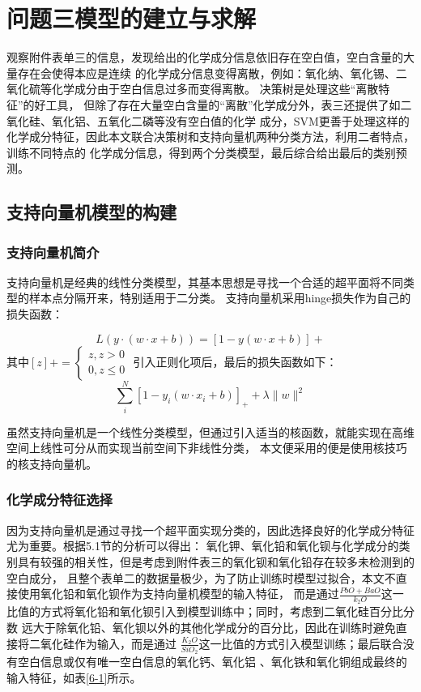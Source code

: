 \documentclass[withoutpreface,bwprint]{cumcmthesis} %
\begin{document}
\section{问题三模型的建立与求解}

观察附件表单三的信息，发现给出的化学成分信息依旧存在空白值，空白含量的大量存在会使得本应是连续 的化学成分信息变得离散，例如：氧化纳、氧化锡、二氧化硫等化学成分由于空白信息过多而变得离散。 决策树是处理这些“离散特征”的好工具， 但除了存在大量空白含量的“离散”化学成分外，表三还提供了如二氧化硅、氧化铝、五氧化二磷等没有空白值的化学 成分，SVM更善于处理这样的化学成分特征，因此本文联合决策树和支持向量机两种分类方法，利用二者特点，训练不同特点的 化学成分信息，得到两个分类模型，最后综合给出最后的类别预测。

\subsection{支持向量机模型的构建}

\subsubsection{支持向量机简介}

支持向量机是经典的线性分类模型，其基本思想是寻找一个合适的超平面将不同类型的样本点分隔开来，特别适用于二分类。 支持向量机采用hinge损失作为自己的损失函数： 

$$L(y \cdot(w \cdot x+b))=[1-y(w \cdot x+b)]{+}$$ 其中$[z]{+}=\left\{\begin{array}{l} z, z>0 \\ 0, z \leq 0 \end{array}\right.$
引入正则化项后，最后的损失函数如下： $$\sum_{i}^{N}\left[1-y_{i}\left(w \cdot x_{i}+b\right)\right]_{+}+\lambda\|w\|^{2}$$

虽然支持向量机是一个线性分类模型，但通过引入适当的核函数，就能实现在高维空间上线性可分从而实现当前空间下非线性分类， 本文便采用的便是使用核技巧的核支持向量机。

\subsubsection{化学成分特征选择}

因为支持向量机是通过寻找一个超平面实现分类的，因此选择良好的化学成分特征尤为重要。根据5.1节的分析可以得出： 氧化钾、氧化铅和氧化钡与化学成分的类别具有较强的相关性，但是考虑到附件表三的氧化钡和氧化铅存在较多未检测到的空白成分， 且整个表单二的数据量极少，为了防止训练时模型过拟合，本文不直接使用氧化铅和氧化钡作为支持向量机模型的输入特征， 而是通过$\frac{PbO+BaO}{k_{2} O}$这一比值的方式将氧化铅和氧化钡引入到模型训练中；同时，考虑到二氧化硅百分比分数 远大于除氧化铅、氧化钡以外的其他化学成分的百分比，因此在训练时避免直接将二氧化硅作为输入，而是通过 $\frac{K_{2}O}{SiO_{2}}$这一比值的方式引入模型训练；最后联合没有空白信息或仅有唯一空白信息的氧化钙、氧化铝 、氧化铁和氧化铜组成最终的输入特征，如表\ref{6-1}所示。
\end{document}
